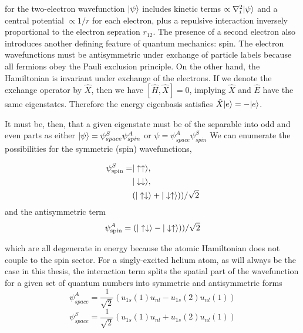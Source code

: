 	\noindent for the two-electron wavefunction $|\psi\rangle$ includes kinetic terms $\propto\nabla_i^2|\psi\rangle$ and a central potential $\propto 1/r$ for each electron, plus a repulsive interaction inversely proportional to the electron sepration $r_{12}$.
	The presence of a second electron also introduces another defining feature of quantum mechanics: spin.
	The electron wavefunctions must be antisymmetric under exchange of particle labels because all fermions obey the Pauli exclusion principle.
	On the other hand, the Hamiltonian is invariant under exchange of the electrons.
	If we denote the exchange operator by $\hat{X}$, then we have $[\hat{H},\hat{X}] = 0$, implying $\hat{X}$ and $\hat{E}$ have the same eigenstates.
	Therefore the energy eigenbasis satisfies $\hat{X}|e\rangle = -|e\rangle$.
	
	
	It must be, then, that a given eigenstate must be of the separable into odd and even parts as either $|\psi\rangle =  \psi^{S}_{space}\psi^{A}_{spin}$ or $\psi=\psi^{A}_{space}\psi^{S}_{spin}$
	We can enumerate the possibilities for the symmetric (spin) wavefunctions, 
	
	\begin{align}
	\psi^S_\text{spin} =& |\uparrow\uparrow\rangle,\\
		&|\downarrow\downarrow\rangle,\\
		&(|\uparrow\downarrow\rangle+|\downarrow\uparrow\rangle))/\sqrt{2}
	\end{align}
	 and the antisymmetric term
	\begin{equation}
	\psi^A_\text{spin} = (|\uparrow\downarrow\rangle-|\downarrow\uparrow\rangle))/\sqrt{2}
	\end{equation}

	\noindent which are all degenerate in energy because the atomic Hamiltonian does not couple to the spin sector.
	For a singly-excited helium atom, as will always be the case in this thesis, the interaction term splits the spatial part of the wavefunction for a given set of quantum numbers into symmetric and antisymmetric forms
	$$
	\psi^{A}_{space} = \frac{1}{\sqrt{2}}\left(u_{1s}(1)u_{nl} - u_{1s}(2)u_{nl}(1)\right)
	$$
	$$
	\psi^{S}_{space} = \frac{1}{\sqrt{2}}\left(u_{1s}(1)u_{nl} + u_{1s}(2)u_{nl}(1)\right)
	$$


